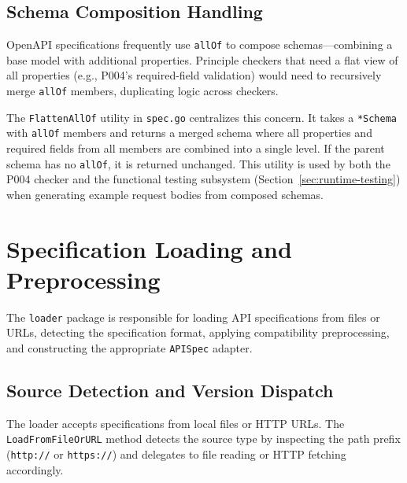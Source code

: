 \subsection{Schema Composition Handling}
\label{subsec:schema-composition}

OpenAPI specifications frequently use \texttt{allOf} to compose schemas---combining a base model with additional properties. Principle checkers that need a flat view of all properties (e.g., P004's required-field validation) would need to recursively merge \texttt{allOf} members, duplicating logic across checkers.

The \texttt{FlattenAllOf} utility in \texttt{spec.go} centralizes this concern. It takes a \texttt{*Schema} with \texttt{allOf} members and returns a merged schema where all properties and required fields from all members are combined into a single level. If the parent schema has no \texttt{allOf}, it is returned unchanged. This utility is used by both the P004 checker and the functional testing subsystem (Section~\ref{sec:runtime-testing}) when generating example request bodies from composed schemas.

\section{Specification Loading and Preprocessing}
\label{sec:loading}

The \texttt{loader} package is responsible for loading API specifications from files or URLs, detecting the specification format, applying compatibility preprocessing, and constructing the appropriate \texttt{APISpec} adapter.

\subsection{Source Detection and Version Dispatch}
\label{subsec:version-dispatch}

The loader accepts specifications from local files or HTTP URLs. The \texttt{LoadFromFileOrURL} method detects the source type by inspecting the path prefix (\texttt{http://} or \texttt{https://}) and delegates to file reading or HTTP fetching accordingly.

